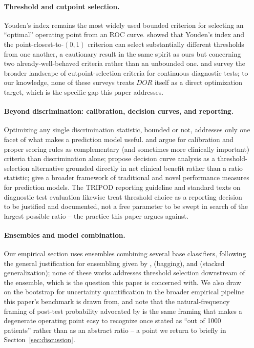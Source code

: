 \documentclass[11pt]{article}
\begin{document}
\paragraph{Threshold and cutpoint selection.} Youden's index
\citep{youden1950} remains the most widely used bounded criterion for
selecting an ``optimal'' operating point from an ROC curve.
\citet{perkins2006} showed that Youden's index and the point-closest-to-$
(0,1)$ criterion can select substantially different thresholds from one
another, a cautionary result in the same spirit as ours but concerning two
already-well-behaved criteria rather than an unbounded one.
\citet{unal2017} and \citet{habibzadeh2016} survey the broader landscape of
cutpoint-selection criteria for continuous diagnostic tests; to our
knowledge, none of these surveys treats $DOR$ itself as a direct
optimization target, which is the specific gap this paper addresses.

\paragraph{Beyond discrimination: calibration, decision curves, and
reporting.} Optimizing any single discrimination statistic, bounded or not,
addresses only one facet of what makes a prediction model useful.
\citet{vancalster2019} and \citet{gneiting2007} argue for calibration and
proper scoring rules as complementary (and sometimes more clinically
important) criteria than discrimination alone; \citet{vickers2006} propose
decision curve analysis as a threshold-selection alternative grounded
directly in net clinical benefit rather than a ratio statistic;
\citet{steyerberg2010} give a broader framework of traditional and novel
performance measures for prediction models. The TRIPOD reporting guideline
\citep{collins2015,moons2015} and standard texts on diagnostic test
evaluation \citep{pepe2003,kraemer1992,hosmer2013} likewise treat threshold
choice as a reporting decision to be justified and documented, not a free
parameter to be swept in search of the largest possible ratio -- the
practice this paper argues against.

\paragraph{Ensembles and model combination.} Our empirical section uses
ensembles combining several base classifiers, following the general
justification for ensembling given by \citet{dietterich2000},
\citet{breiman1996} (bagging), and \citet{wolpert1992} (stacked
generalization); none of these works addresses threshold selection
downstream of the ensemble, which is the question this paper is concerned
with. We also draw on the bootstrap \citep{efron1993} for uncertainty
quantification in the broader empirical pipeline this paper's benchmark is
drawn from, and note that the natural-frequency framing of post-test
probability advocated by \citet{gigerenzer1995} is the same framing that
makes a degenerate operating point easy to recognize once stated as
``out of 1000 patients'' rather than as an abstract ratio -- a point we
return to briefly in Section~\ref{sec:discussion}.
\end{document}
